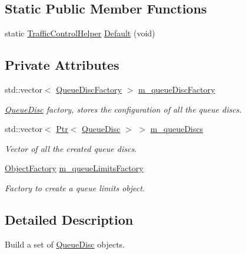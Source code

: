 \subsection*{Static Public Member Functions}
\begin{DoxyCompactItemize}
\item 
static \hyperlink{classns3_1_1TrafficControlHelper}{Traffic\+Control\+Helper} \hyperlink{classns3_1_1TrafficControlHelper_afa16cd2a1209beb1c18fa5e8153ba8b8}{Default} (void)
\end{DoxyCompactItemize}
\subsection*{Private Attributes}
\begin{DoxyCompactItemize}
\item 
std\+::vector$<$ \hyperlink{classns3_1_1QueueDiscFactory}{Queue\+Disc\+Factory} $>$ \hyperlink{classns3_1_1TrafficControlHelper_ae4ef4231b502104a4fd4245e53f9ae68}{m\+\_\+queue\+Disc\+Factory}
\begin{DoxyCompactList}\small\item\em \hyperlink{classns3_1_1QueueDisc}{Queue\+Disc} factory, stores the configuration of all the queue discs. \end{DoxyCompactList}\item 
std\+::vector$<$ \hyperlink{classns3_1_1Ptr}{Ptr}$<$ \hyperlink{classns3_1_1QueueDisc}{Queue\+Disc} $>$ $>$ \hyperlink{classns3_1_1TrafficControlHelper_a0eb99bd58e5d9858d7eb5b4453f886b1}{m\+\_\+queue\+Discs}
\begin{DoxyCompactList}\small\item\em Vector of all the created queue discs. \end{DoxyCompactList}\item 
\hyperlink{classns3_1_1ObjectFactory}{Object\+Factory} \hyperlink{classns3_1_1TrafficControlHelper_a7f9b244a4dc4e88326850501d56bffa4}{m\+\_\+queue\+Limits\+Factory}
\begin{DoxyCompactList}\small\item\em Factory to create a queue limits object. \end{DoxyCompactList}\end{DoxyCompactItemize}


\subsection{Detailed Description}
Build a set of \hyperlink{classns3_1_1QueueDisc}{Queue\+Disc} objects. 

